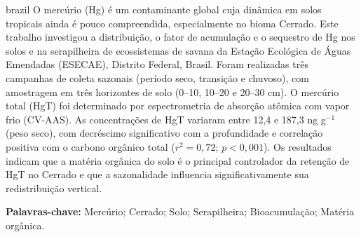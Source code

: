 \documentclass[
  12pt,
  openany,   %
  oneside,   %
  a4paper,
  english, brazil, sumario=tradicional
]{abntex2}
\newif\ifingles
\newcommand{\tipodotrabalho}{Projeto de Mestrado}
\newcommand{\tipodotrabalho}{Projeto de Doutorado}
\newcommand{\tipodotrabalho}{Dissertação de Mestrado}
\newcommand{\tipodotrabalho}{Tese de Doutorado}
\newcommand{\MesAno}{Mês/Ano}
\newcommand{\refbibliografica}{%
  SOBRENOME, Nome. \textit{\imprimirtitulo}. \MesAno. N~f.
  \tipodotrabalho~-- Programa de Pós-Graduação em Ciências Ambientais,
  Faculdade UnB de Planaltina, Universidade de Brasília, Brasília, \MesAno.}
\begin{document}
\begin{resumo}[Resumo]
  \begin{otherlanguage*}{brazil}
  \OnehalfSpacing
  O mercúrio (Hg) é um contaminante global cuja dinâmica em solos
  tropicais ainda é pouco compreendida, especialmente no bioma Cerrado.
  Este trabalho investigou a distribuição, o fator de acumulação e o
  sequestro de Hg nos solos e na serapilheira de ecossistemas de savana
  da Estação Ecológica de Águas Emendadas (ESECAE), Distrito Federal,
  Brasil. Foram realizadas três campanhas de coleta sazonais (período
  seco, transição e chuvoso), com amostragem em três horizontes de solo
  (0--10, 10--20 e 20--30 cm). O mercúrio total (HgT) foi determinado
  por espectrometria de absorção atômica com vapor frio (CV-AAS).
  As concentrações de HgT variaram entre 12,4 e 187,3 ng g$^{-1}$
  (peso seco), com decréscimo significativo com a profundidade e
  correlação positiva com o carbono orgânico total ($r^2 = 0{,}72$;
  $p < 0{,}001$). Os resultados indicam que a matéria orgânica do solo
  é o principal controlador da retenção de HgT no Cerrado e que a
  sazonalidade influencia significativamente sua redistribuição vertical.

  \vspace{\onelineskip}
  \noindent
  \textbf{Palavras-chave:} Mercúrio; Cerrado; Solo; Serapilheira;
  Bioacumulação; Matéria orgânica.
  \end{otherlanguage*}
\end{resumo}
\end{document}
